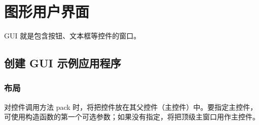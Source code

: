 \chapter{图形用户界面\label{ch12}}
GUI 就是包含按钮、文本框等控件的窗口。
\section{创建 GUI 示例应用程序}
\subsection{布局}
对控件调用方法 pack 时，将把控件放在其父控件（主控件）中。要指定主控件，可使用构造函数的第一个可选参数；如果没有指定，将把顶级主窗口用作主控件。